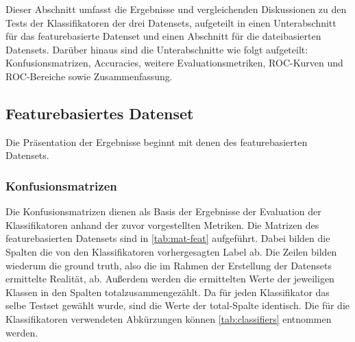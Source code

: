 Dieser Abschnitt umfasst die Ergebnisse und vergleichenden Diskussionen zu den Tests der Klassifikatoren der drei Datensets, aufgeteilt in einen Unterabschnitt für das featurebasierte Datenset und einen Abschnitt für die dateibasierten Datensets. Darüber hinaus sind die Unterabschnitte wie folgt aufgeteilt: Konfusionsmatrizen, Accuracies, weitere Evaluationsmetriken, ROC-Kurven und ROC-Bereiche sowie Zusammenfassung.

\subsection{Featurebasiertes Datenset}

Die Präsentation der Ergebnisse beginnt mit denen des featurebasierten Datensets.

\subsubsection*{Konfusionsmatrizen}

Die Konfusionsmatrizen dienen als Basis der Ergebnisse der Evaluation der Klassifikatoren anhand der zuvor vorgestellten Metriken. Die Matrizen des featurebasierten Datensets sind in \autoref{tab:mat-feat} aufgeführt. Dabei bilden die Spalten die von den Klassifikatoren vorhergesagten Label ab. Die Zeilen bilden wiederum die \glqq ground truth\grqq{}, also die im Rahmen der Erstellung der Datensets ermittelte Realität, ab. Außerdem werden die ermittelten Werte der jeweiligen Klassen in den Spalten \glqq total\grqq zusammengezählt. Da für jeden Klassifikator das selbe Testset gewählt wurde, sind die Werte der \glqq total\grqq-Spalte identisch. Die für die Klassifikatoren verwendeten Abkürzungen können \autoref{tab:classifiers} entnommen werden.

